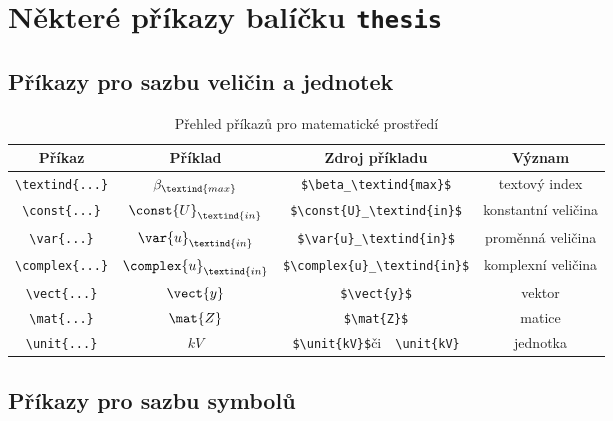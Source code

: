 \chapter{Některé příkazy balíčku \texttt{thesis}}

\section{Příkazy pro sazbu veličin a jednotek}

\begin{table}[!h]
  \caption[Přehled příkazů]{Přehled příkazů pro matematické prostředí }
  \begin{center}
  	\small
	  \begin{tabular}{|c|c|c|c|}
	    \hline
	    Příkaz    						& Příklad 					& Zdroj příkladu  							& Význam  \\
	    \hline\hline
	    \verb|\textind{...}|	& $\beta_\textind{max}$ 	& \verb|$\beta_\textind{max}$|	& textový index \\
	    \hline
	    \verb|\const{...}| 		& $\const{U}_\textind{in}$ 				& \verb|$\const{U}_\textind{in}$|		& konstantní veličina \\
	    \hline
	    \verb|\var{...}| 		& $\var{u}_\textind{in}$ & \verb|$\var{u}_\textind{in}$| & proměnná veličina \\
	    \hline
	    \verb|\complex{...}| 	& $\complex{u}_\textind{in}$ & \verb|$\complex{u}_\textind{in}$| & komplexní veličina \\
	    \hline
	    \verb|\vect{...}| 		& $\vect{y}$ 						& \verb|$\vect{y}$| & vektor \\
	    \hline
	    \verb|\mat{...}| 	& $\mat{Z}$ 						& \verb|$\mat{Z}$| & matice \\
	    \hline
	    \verb|\unit{...}| 		& $\unit{kV}$ 						& \verb|$\unit{kV}$|\quad či\ \, \verb|\unit{kV}| & jednotka \\
	    \hline
	  \end{tabular}
  \end{center}
\end{table}



\section{Příkazy pro sazbu symbolů}

